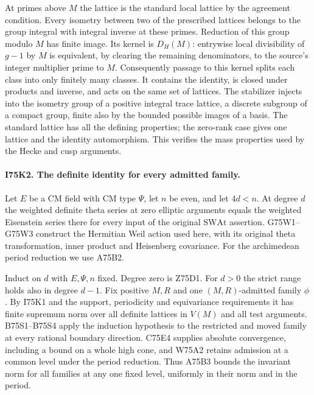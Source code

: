 At primes above $M$ the lattice is the standard local lattice by
the agreement condition. Every isometry between two of the
prescribed lattices belongs to the group integral with integral
inverse at these primes. Reduction of this group modulo $M$ has
finite image. Its kernel is $D_H(M)$: entrywise local divisibility
of $g-1$ by $M$ is equivalent, by clearing the remaining
denominators, to the source's integer multiplier prime to $M$.
Consequently passage to this kernel splits each class into only
finitely many classes. It contains the identity, is closed under
products and inverse, and acts on the same set of lattices.
The stabilizer injects into the isometry group of a positive
integral trace lattice, a discrete subgroup of a compact group,
finite also by the bounded possible images of a basis. The standard
lattice has all the defining properties; the zero-rank case gives
one lattice and the identity automorphism. This verifies the mass
properties used by the Hecke and cusp arguments.

\paragraph{I75K2. The definite identity for every admitted family.}
Let $E$ be a CM field with CM type $\Psi$, let $n$ be even, and
let $4d<n$. At degree $d$ the weighted definite theta series at
zero elliptic arguments equals the weighted Eisenstein series there
for every input of the original $\mathrm{SWAt}$ assertion.
G75W1--G75W3 construct the Hermitian Weil action used here, with its
original theta transformation, inner product and Heisenberg covariance.
For the archimedean period reduction we use A75B2.

Induct on $d$ with $E,\Psi,n$ fixed. Degree zero is Z75D1. For
$d>0$ the strict range holds also in degree $d-1$. Fix positive
$M,R$ and one $(M,R)$-admitted family $\phi$. By I75K1 and the
support, periodicity and equivariance requirements it has finite
supremum norm over all definite lattices in $V(M)$ and all test
arguments. B75S1--B75S4 apply the induction hypothesis to the
restricted and moved family at every rational boundary direction.
C75E4 supplies absolute convergence, including a bound on a whole
high cone, and W75A2 retains admission at a common level under
the period reduction. Thus A75B3 bounds the invariant norm
for all families at any one fixed level, uniformly in their norm
and in the period.

